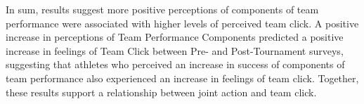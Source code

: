 \begin{CJK}{UTF8}{gbsn}
In sum, results suggest more positive perceptions of components of team performance were associated with higher levels of perceived team click. A positive increase in perceptions of Team Performance Components predicted a positive increase in feelings of Team Click between Pre- and Post-Tournament surveys, suggesting that athletes who perceived an increase in success of components of team performance also experienced an increase in feelings of team click. Together, these results support a relationship between joint action and team click.











\end{CJK}
